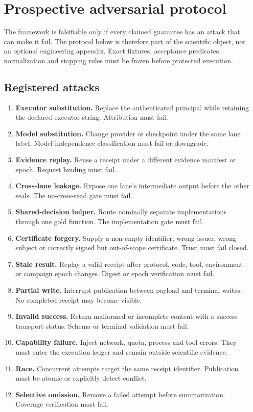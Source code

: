 \section{Prospective adversarial protocol}
\label{sec:attacks}

The framework is falsifiable only if every claimed guarantee has an attack that
can make it fail. The protocol below is therefore part of the scientific object,
not an optional engineering appendix. Exact fixtures, acceptance predicates,
normalization and stopping rules must be frozen before protected execution.

\subsection{Registered attacks}

\begin{enumerate}[label=\textbf{A\arabic*.}]
  \item \textbf{Executor substitution.} Replace the authenticated principal while
        retaining the declared executor string. Attribution must fail.
  \item \textbf{Model substitution.} Change provider or checkpoint under the same
        lane label. Model-independence classification must fail or downgrade.
  \item \textbf{Evidence replay.} Reuse a receipt under a different evidence
        manifest or epoch. Request binding must fail.
  \item \textbf{Cross-lane leakage.} Expose one lane's intermediate output before
        the other seals. The no-cross-read gate must fail.
  \item \textbf{Shared-decision helper.} Route nominally separate implementations
        through one gold function. The implementation gate must fail.
  \item \textbf{Certificate forgery.} Supply a non-empty identifier, wrong issuer,
        wrong subject or correctly signed but out-of-scope certificate. Trust must
        fail closed.
  \item \textbf{Stale result.} Replay a valid receipt after protocol, code, tool,
        environment or campaign epoch changes. Digest or epoch verification must fail.
  \item \textbf{Partial write.} Interrupt publication between payload and terminal
        writes. No completed receipt may become visible.
  \item \textbf{Invalid success.} Return malformed or incomplete content with a
        success transport status. Schema or terminal validation must fail.
  \item \textbf{Capability failure.} Inject network, quota, process and tool errors.
        They must enter the execution ledger and remain outside scientific evidence.
  \item \textbf{Race.} Concurrent attempts target the same receipt identifier.
        Publication must be atomic or explicitly detect conflict.
  \item \textbf{Selective omission.} Remove a failed attempt before summarization.
        Coverage verification must fail.
\end{enumerate}

